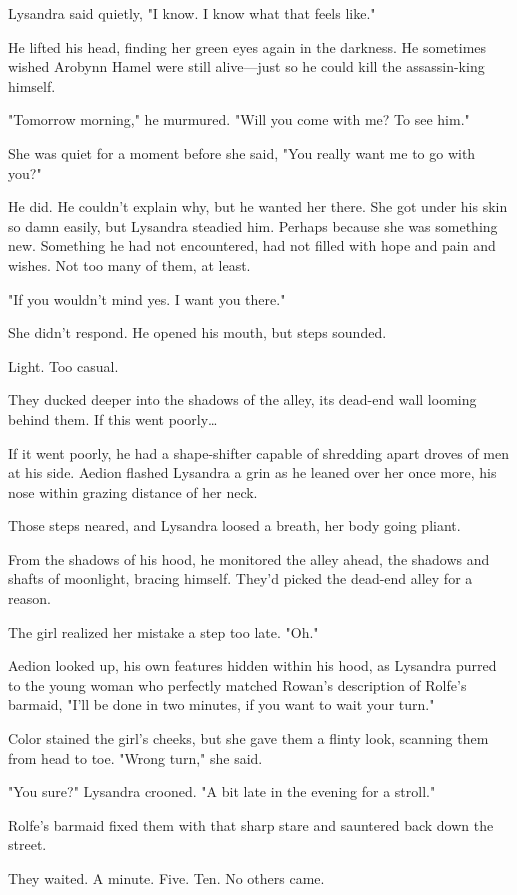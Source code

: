 Lysandra said quietly, "I know. I know what that feels like."

He lifted his head, finding her green eyes again in the darkness. He sometimes wished Arobynn Hamel were still alive---just so he could kill the assassin-king himself.

"Tomorrow morning," he murmured. "Will you come with me? To see him."

She was quiet for a moment before she said, "You really want me to go with you?"

He did. He couldn't explain why, but he wanted her there. She got under his skin so damn easily, but  Lysandra steadied him. Perhaps because she was something new. Something he had not encountered, had not filled with hope and pain and wishes. Not too many of them, at least.

"If you wouldn't mind  yes. I want you there."

She didn't respond. He opened his mouth, but steps sounded.

Light. Too casual.

They ducked deeper into the shadows of the alley, its dead-end wall looming behind them. If this went poorly\ldots{}

If it went poorly, he had a shape-shifter capable of shredding apart droves of men at his side. Aedion flashed Lysandra a grin as he leaned over her once more, his nose within grazing distance of her neck.

Those steps neared, and Lysandra loosed a breath, her body going pliant.

From the shadows of his hood, he monitored the alley ahead, the shadows and shafts of moonlight, bracing himself. They'd picked the dead-end alley for a reason.

The girl realized her mistake a step too late. "Oh."

Aedion looked up, his own features hidden within his hood, as Lysandra purred to the young woman who perfectly matched Rowan's description of Rolfe's barmaid, "I'll be done in two minutes, if you want to wait your turn."

Color stained the girl's cheeks, but she gave them a flinty look, scanning them from head to toe. "Wrong turn," she said.

"You sure?" Lysandra crooned. "A bit late in the evening for a stroll."

Rolfe's barmaid fixed them with that sharp stare and sauntered back down the street.

They waited. A minute. Five. Ten. No others came.

